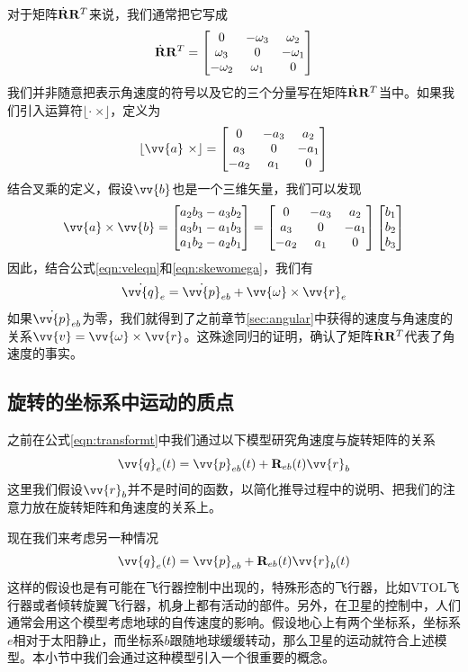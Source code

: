 \documentclass[11pt]{article}
\begin{document}
对于矩阵$\dot{{\bf R}}{\bf R}^T$来说，我们通常把它写成
\begin{equation}\label{eqn:skewomega}
\dot{{\bf R}}{\bf R}^T = \begin{bmatrix}
0 & -\omega_3 & \omega_2\\
\omega_3 & 0 & - \omega_1\\
-\omega_2 & \omega_1 & 0
\end{bmatrix}
\end{equation}
我们并非随意把表示角速度的符号以及它的三个分量写在矩阵$\dot{{\bf R}}{\bf R}^T$当中。如果我们引入运算符$\lfloor \cdot \ \times \rfloor$，定义为
$$
\lfloor \vv{a} \ \times \rfloor =  \begin{bmatrix}
0 & -a_3 & a_2\\
a_3 & 0 & - a_1\\
-a_2 & a_1 & 0
\end{bmatrix}
$$
结合叉乘的定义，假设$\vv{b}$也是一个三维矢量，我们可以发现
$$
\vv{a} \times \vv{b} = 
\begin{bmatrix}
a_2b_3-a_3b_2\\
a_3b_1-a_1b_3\\
a_1b_2-a_2b_1
\end{bmatrix} =
\begin{bmatrix}
0 & -a_3 & a_2\\
a_3 & 0 & - a_1\\
-a_2 & a_1 & 0
\end{bmatrix}
\begin{bmatrix}
b_1\\
b_2\\
b_3
\end{bmatrix}
$$
因此，结合公式\ref{eqn:veleqn}和\ref{eqn:skewomega}，我们有
$$
\dot{\vv{q}}_{e}  = \dot{ \vv{p}}_{eb} + \vv{\omega} \times \vv{r}_e
$$
如果$\dot{ \vv{p}}_{eb}$为零，我们就得到了之前章节\ref{sec:angular}中获得的速度与角速度的关系$\vv{v} = \vv{\omega} \times \vv{r}$。这殊途同归的证明，确认了矩阵$\dot{{\bf R}}{\bf R}^T$代表了角速度的事实。

\subsection{旋转的坐标系中运动的质点}\label{sec:movingcor}
之前在公式\ref{eqn:transformt}中我们通过以下模型研究角速度与旋转矩阵的关系
$$
\vv{q}_{e}(t) = \vv{p}_{eb}(t) + {\bf R}_{eb}(t)\vv{r}_b
$$
这里我们假设$\vv{r}_b$并不是时间的函数，以简化推导过程中的说明、把我们的注意力放在旋转矩阵和角速度的关系上。

现在我们来考虑另一种情况
\begin{equation}\label{eqn:transformt2}
\vv{q}_{e}(t) = \vv{p}_{eb} + {\bf R}_{eb}(t)\vv{r}_b(t)
\end{equation}
这样的假设也是有可能在飞行器控制中出现的，特殊形态的飞行器，比如VTOL飞行器或者倾转旋翼飞行器，机身上都有活动的部件。另外，在卫星的控制中，人们通常会用这个模型考虑地球的自传速度的影响。假设地心上有两个坐标系，坐标系$e$相对于太阳静止，而坐标系$b$跟随地球缓缓转动，那么卫星的运动就符合上述模型。本小节中我们会通过这种模型引入一个很重要的概念。
\end{document}
